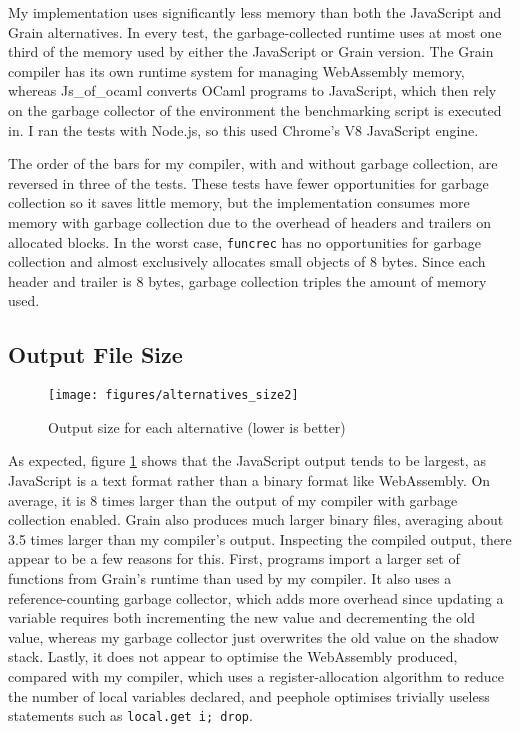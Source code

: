 My implementation uses significantly less memory than both the JavaScript and Grain alternatives. In every test, %
the garbage-collected runtime uses at most one third of the memory used by either the JavaScript or Grain version. 
The Grain compiler has its own runtime system for managing WebAssembly memory, whereas Js\_of\_ocaml converts OCaml programs to JavaScript, which then rely on the garbage collector of the environment the benchmarking script is executed in. I ran the tests with Node.js, so this used Chrome's V8 JavaScript engine.


The order of the bars for my compiler, with and without garbage collection, are reversed in three of the tests. These tests have fewer opportunities for garbage collection so it saves little memory, but the implementation consumes more memory with garbage collection due to the overhead of headers and trailers on allocated blocks. In the worst case, \verb|funcrec| has no opportunities for garbage collection and almost exclusively allocates small objects of 8 bytes. Since each header and trailer is 8 bytes, garbage collection triples the amount of memory used.



\subsection{Output File Size}

\begin{figure}[H]
\hspace{-1.2cm}
\texttt{[image: figures/alternatives\_size2]}
\vspace{-0.8cm}
\caption{Output size for each alternative (lower is better)}
 \label{fig:alt_size} 
\end{figure}

As expected, figure \ref{fig:alt_size} shows that the JavaScript output tends to be largest, as JavaScript is a text format rather than a binary format like WebAssembly. On average, it is 8 times larger than the output of my compiler with garbage collection enabled. Grain also produces much larger binary files, averaging about 3.5 times larger than my compiler's output. Inspecting the compiled output, there appear to be a few reasons for this. First, programs import a larger set of functions from Grain's runtime than used by my compiler. It also uses a reference-counting garbage collector, which adds more overhead since updating a variable requires both incrementing the new value and decrementing the old value, whereas my garbage collector just overwrites the old value on the shadow stack. Lastly, it does not appear to optimise the WebAssembly produced, compared with my compiler, which uses a register-allocation algorithm to reduce the number of local variables declared, and peephole optimises trivially useless statements such as \verb|local.get i; drop|.

